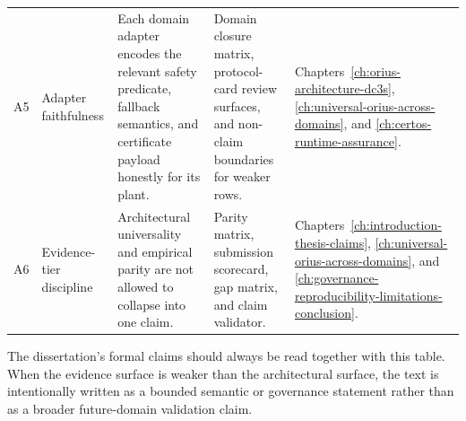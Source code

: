 \begin{longtable}{p{}p{}p{}p{}p{}}
A5 & Adapter faithfulness & Each domain adapter encodes the relevant safety predicate, fallback semantics, and certificate payload honestly for its plant. & Domain closure matrix, protocol-card review surfaces, and non-claim boundaries for weaker rows. & Chapters~\ref{ch:orius-architecture-dc3s}, \ref{ch:universal-orius-across-domains}, and \ref{ch:certos-runtime-assurance}.\\
A6 & Evidence-tier discipline & Architectural universality and empirical parity are not allowed to collapse into one claim. & Parity matrix, submission scorecard, gap matrix, and claim validator. & Chapters~\ref{ch:introduction-thesis-claims}, \ref{ch:universal-orius-across-domains}, and \ref{ch:governance-reproducibility-limitations-conclusion}.\\
\bottomrule
\end{longtable}

The dissertation's formal claims should always be read together with this table. When the
evidence surface is weaker than the architectural surface, the text is intentionally written
as a bounded semantic or governance statement rather than as a broader future-domain
validation claim.
